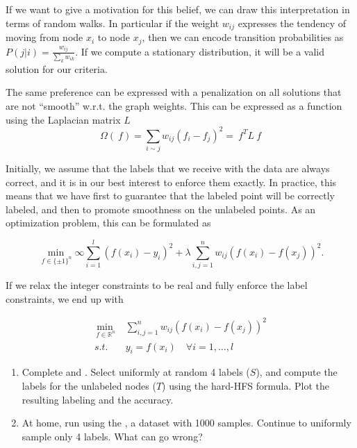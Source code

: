\documentclass{article}
\begin{document}
	If we want to give a motivation for this belief,
	we can draw this interpretation in terms of random walks. In particular
	if the weight $w_{ij}$ expresses the tendency of moving
	from node $x_i$ to node $x_j$, then we can encode transition probabilities as
	$
	P(j|i) = \frac{w_{ij}}{\sum_k w_{ik}}.
	$
	If we compute a stationary distribution, it will be a valid solution for
	our criteria.
	
	The same preference can be expressed with a penalization on all solutions
	that are not ``smooth'' {w.r.t.} the graph weights.
	This can be expressed as a function using the Laplacian matrix $L$
	$$
	\Omega(\:f)=\sum_{i\sim j}w_{ij}(f_{i}-f_{j})^{2} = \:f^{T}L\:f
	$$
	
	Initially, we assume that the labels that we receive with the data are
	always correct, and it is in our best interest to enforce them exactly.
	In practice, this means that we have first to guarantee that the labeled
	point will be correctly labeled, and then to promote smoothness on the
	unlabeled points. As an optimization problem, this can be formulated as
	
	\[
	\min_{\:f \in \{\pm 1\}^{n} }\infty \sum_{i=1}^{l} \left( f(x_i) - y_i \right)^2
	+ \lambda\sum_{i,j=1}^{n} w_{ij} \left( f(x_i)  - f(x_j)  \right)^2.
	\]
	
	If we relax the integer constraints to be real and fully enforce the label
	constraints, we end up with
	
	\begin{align*}
	\min_{\:f \in \mathbb{R}^{n} }
	&  \sum_{i,j=1}^{n} w_{ij} \left( f(x_i)  - f(x_j)  \right)^2 \\
	s.t. \quad & y_i  = f(x_i)   \quad \forall i = 1,\dots,l
	\end{align*}
	
	
	\begin{enumerate}
		\item Complete  and  .
		Select uniformly at random 4 labels ($S$),
		and compute the labels for
		the unlabeled nodes ($T$) using the hard-HFS formula.
		Plot the resulting labeling and the accuracy.
		\item At home, run  using the ,
		a dataset with 1000 samples.
		Continue to uniformly sample
		only 4 labels. What can go wrong?
	\end{enumerate}
	
\end{document}
